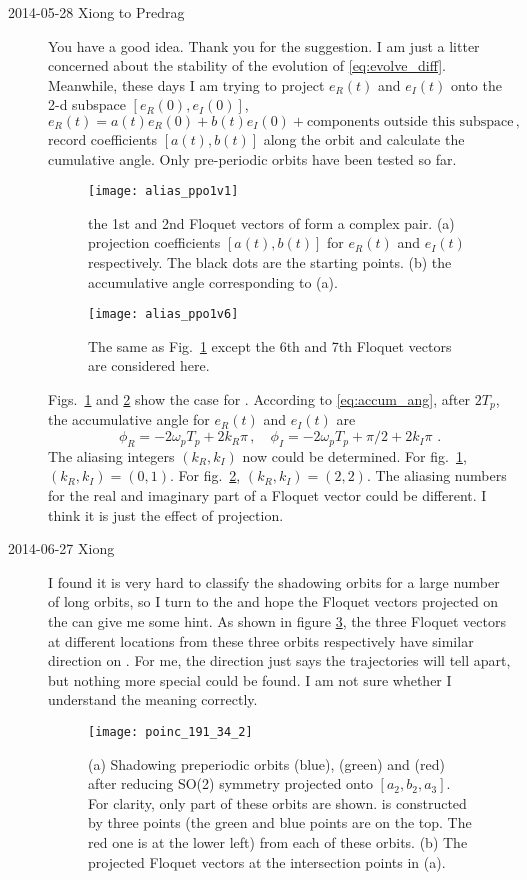 \begin{description}
\item[2014-05-28 Xiong to Predrag] You have a good idea. Thank you
for the suggestion.
I am just a litter concerned about the stability of the evolution
of \eqref{eq:evolve_diff}. Meanwhile, these days I am trying to
project $e_R(t)$ and $e_I(t)$ onto the 2-d subspace $[e_R(0),e_I(0)]$,
\[
e_R(t)=a(t)e_R(0)+b(t)e_I(0)+\text{components outside this subspace}
\,,
\]
record coefficients $[a(t),b(t)]$ along the orbit and calculate the
cumulative angle. Only pre-periodic orbits have been tested so far.
\begin{figure}[h]
  \centering
  \texttt{[image: alias\_ppo1v1]}
  \caption{the 1st and 2nd Floquet vectors of 
  form a complex pair. (a) projection coefficients $[a(t),b(t)]$
  for $e_R(t)$ and $e_I(t)$ respectively. The black dots are the
  starting points. (b) the accumulative angle corresponding to (a).
}
  \label{fig:alias_ppo1v1}
\end{figure}
\begin{figure}[h]
  \centering
  \texttt{[image: alias\_ppo1v6]}
  \caption{ The same as Fig.~\ref{fig:alias_ppo1v1} except the
    6th and 7th Floquet vectors are considered here.
  }
  \label{fig:alias_ppo1v6}
\end{figure}
Figs.~\ref{fig:alias_ppo1v1} and \ref{fig:alias_ppo1v6} show the case for
. According to \eqref{eq:accum_ang}, after $2T_p$,
the accumulative angle for $e_R(t)$ and $e_I(t)$ are
\[
\phi_R=-2\omega_p T_p + 2k_R\pi \,,\quad
\phi_I=-2\omega_p T_p + \pi/2 + 2k_I\pi \,
\,.
\]
The aliasing integers $(k_R, k_I)$ now could be determined. For
fig.~\ref{fig:alias_ppo1v1}, $(k_R, k_I)=(0,1)$. For
fig.~\ref{fig:alias_ppo1v6}, $(k_R, k_I)=(2,2)$. The aliasing numbers
for the real and imaginary part of a Floquet vector could be different.
I think it is just the effect of projection.


\item[2014-06-27 Xiong]

I found it is very hard to classify the shadowing orbits for a large
number of long orbits, so I turn to the {\PoincSec} and hope the
Floquet vectors projected on the {\PoincSec} can give me some hint. As
shown in figure \ref{fig:poinc_191_34_2}, the three Floquet vectors at
different locations from these three orbits respectively have similar
direction on {\PoincSec}. For me, the direction just says the
trajectories will tell apart, but nothing more special could be found.
I am not sure whether I understand the meaning correctly.
  \begin{figure}[h]
    \centering
    \texttt{[image: poinc\_191\_34\_2]}
    \caption{(a) Shadowing preperiodic orbits  (blue),
       (green) and  (red)
      after reducing SO(2) symmetry projected onto $[a_2,b_2,a_3]$.
      For clarity, only part of these orbits are shown. {\PoincSec}
      is constructed by three points (the green and blue points are on the
      top. The red one is at the lower left)
      from each of these orbits. (b) The
      projected Floquet vectors at the intersection points in (a).
    }
    \label{fig:poinc_191_34_2}
  \end{figure}


\end{description}
